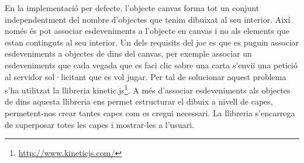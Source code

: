 En la implementació per defecte, l'objecte canvas forma tot un conjunt independentment del nombre d'objectes que tenim dibuixat al seu interior. Així només és pot associar esdeveniments a l'objecte en canvas i no als elements que estan continguts al seu interior. Un dels requisits del joc es que es puguin associar esdeveniments a objectes de dins del canvas, per exemple associar un esdeveniments que cada vegada que es faci clic sobre una carta s'enviï una petició al servidor sol·licitant que es vol jugar. Per tal de solucionar aquest problema s'ha utilitzat la llibreria kinetic.js\footnote{\url{http://www.kineticjs.com/}}. A més d'associar esdeveniments als objectes de dins aquesta llibreria ens permet estructurar el dibuix a nivell de capes, permetent-nos crear tantes capes com es cregui necessari. La llibreria s'encarrega de superposar totes les capes i mostrar-les a l'usuari. 
